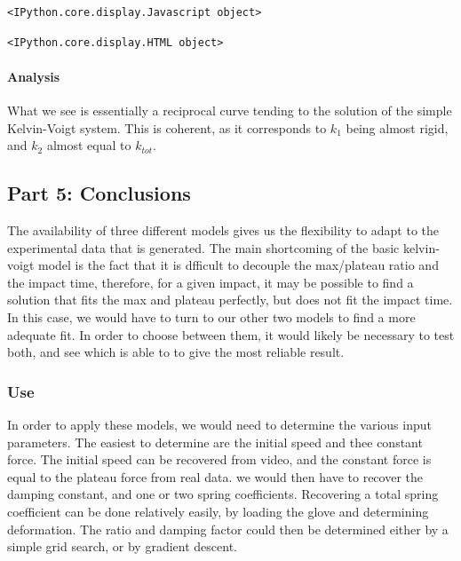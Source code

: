\documentclass[11pt]{article}
\begin{document}
    
    \begin{verbatim}
<IPython.core.display.Javascript object>
    \end{verbatim}

    
    
    \begin{verbatim}
<IPython.core.display.HTML object>
    \end{verbatim}

    
    \paragraph{Analysis}\label{analysis}

What we see is essentially a reciprocal curve tending to the solution of
the simple Kelvin-Voigt system. This is coherent, as it corresponds to
$k_1$ being almost rigid, and $k_2$ almost equal to $k_{tot}$.

    \subsection{Part 5: Conclusions}\label{part-5-conclusions}

The availability of three different models gives us the flexibility to
adapt to the experimental data that is generated. The main shortcoming
of the basic kelvin-voigt model is the fact that it is dfficult to
decouple the max/plateau ratio and the impact time, therefore, for a
given impact, it may be possible to find a solution that fits the max
and plateau perfectly, but does not fit the impact time. In this case,
we would have to turn to our other two models to find a more adequate
fit. In order to choose between them, it would likely be necessary to
test both, and see which is able to to give the most reliable result.

\subsubsection{Use}\label{use}

In order to apply these models, we would need to determine the various
input parameters. The easiest to determine are the initial speed and
thee constant force. The initial speed can be recovered from video, and
the constant force is equal to the plateau force from real data. we
would then have to recover the damping constant, and one or two spring
coefficients. Recovering a total spring coefficient can be done
relatively easily, by loading the glove and determining deformation. The
ratio and damping factor could then be determined either by a simple
grid search, or by gradient descent.
\end{document}

